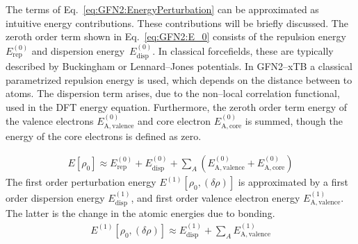 	The terms of Eq.~\eqref{eq:GFN2:EnergyPerturbation} can be approximated as  intuitive energy contributions.
	These contributions will be briefly discussed.
	The zeroth order term shown in Eq.~\eqref{eq:GFN2:E_0} consists of the repulsion energy~$E_\mathrm{rep}^{(0)}$ and
	dispersion energy~$E_\mathrm{disp}^{(0)}$. In classical forcefields, these are typically described by Buckingham or Lennard--Jones potentials.
	In GFN2--xTB a classical parametrized repulsion energy is used, which depends on the distance between to atoms.
	The dispersion term arises, due to the non--local correlation functional, used in the DFT energy equation.
    Furthermore, the zeroth order term energy of the valence electrons $E_\mathrm{A,valence}^{(0)}$
	and core electron $E_\mathrm{A,core}^{(0)}$ is summed, though the energy of the core electrons is defined as zero.

    \begin{align}
        \label{eq:GFN2:E_0}
        E[\rho_0] \approx E_\mathrm{rep}^{(0)} + E_\mathrm{disp}^{(0)} + \sum_A \left(E_\mathrm{A,valence}^{(0)} + E_\mathrm{A,core}^{(0)}\right)
    \end{align}	
	\newpage
	The first order perturbation energy $E^{(1)}[\rho_0,(\delta \rho)]$
	is approximated by a first order dispersion energy $E_\mathrm{disp}^{(1)}$,
	and first order valence electron energy $E_\mathrm{A,valence}^{(1)}$.
	The latter is the change in the atomic energies due to bonding.
	\begin{align}
        \label{eq:GFN2:E_1}
		E^{(1)}[\rho_0,(\delta \rho)] \approx E_\mathrm{disp}^{(1)} + \sum_A E_\mathrm{A,valence}^{(1)}
    \end{align}

